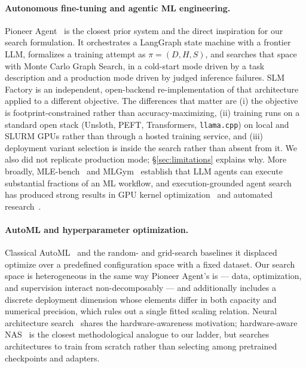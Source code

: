 \documentclass[sigconf,10pt]{acmart}
\newcommand{\xref}[1]{\S\ref{#1}}
\begin{document}
\paragraph{Autonomous fine-tuning and agentic ML engineering.}
Pioneer Agent~\cite{atreja2026pioneer} is the closest prior system and the direct
inspiration for our search formulation. It orchestrates a LangGraph state machine with a
frontier LLM, formalizes a training attempt as $\pi=(D,H,S)$, and searches that space with
Monte Carlo Graph Search, in a cold-start mode driven by a task description and a production
mode driven by judged inference failures. SLM Factory is an independent, open-backend
re-implementation of that architecture applied to a different objective. The differences that
matter are (i) the objective is footprint-constrained rather than accuracy-maximizing,
(ii) training runs on a standard open stack (Unsloth, PEFT, Transformers,
\texttt{llama.cpp}) on local and SLURM GPUs rather than through a hosted training service,
and (iii) deployment variant selection is inside the search rather than absent from it.
We also did not replicate production mode; \xref{sec:limitations} explains why.
More broadly, MLE-bench~\cite{chan2024mlebench} and MLGym~\cite{nam2025mlgym} establish that
LLM agents can execute substantial fractions of an ML workflow, and execution-grounded agent
search has produced strong results in GPU kernel optimization~\cite{chen2026kernelagent} and
automated research~\cite{yamada2025aiscientist,gottweis2025coscientist}.

\paragraph{AutoML and hyperparameter optimization.}
Classical AutoML~\cite{thornton2013autoweka,feurer2015autosklearn,feurer2019automl} and the
random- and grid-search baselines it displaced~\cite{bergstra2012random} optimize over a
predefined configuration space with a fixed dataset. Our search space is heterogeneous in
the same way Pioneer Agent's is --- data, optimization, and supervision interact
non-decomposably --- and additionally includes a discrete deployment dimension whose
elements differ in both capacity and numerical precision, which rules out a single fitted
scaling relation. Neural architecture search~\cite{elsken2019nas} shares the
hardware-awareness motivation; hardware-aware NAS~\cite{cai2019proxylessnas,
wu2019fbnet,tan2019mnasnet} is the closest methodological analogue to our ladder, but
searches architectures to train from scratch rather than selecting among pretrained
checkpoints and adapters.
\end{document}
